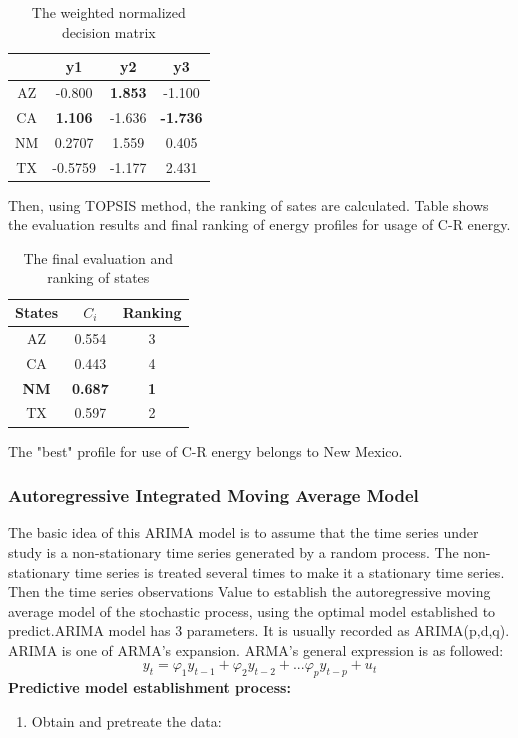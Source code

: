 \documentclass{mcmthesis}
\begin{document}
\begin{enumerate}
      \begin{table}
      \centering
      \begin{tabular}{cccc}
      \hline
      {}&{y1}&{y2}&{y3}\\
      \hline
      {AZ}&-0.800&\textbf{1.853}&-1.100\\
      \hline
      {CA}&\textbf{1.106}&-1.636&\textbf{-1.736}\\
      \hline
      {NM}&0.2707&1.559&0.405\\
      \hline
      {TX}&-0.5759&-1.177&2.431\\
      \hline
      \end{tabular}
      \caption{The weighted normalized decision matrix}
      \end{table}

      Then, using TOPSIS method, the ranking of sates are calculated. Table shows the evaluation results and final ranking of energy profiles for usage of C-R energy.

      \begin{table}
      \begin{tabular}{ccc}
      \hline
      {States}&{$C_i$}&{Ranking}\\
      \hline
      {AZ}&0.554&3\\
      \hline
      {CA}&0.443&4\\
      \hline
      \textbf{NM}&\textbf{0.687}&\textbf{1}\\
      \hline
      {TX}&0.597&2\\
      \hline

      \end{tabular}
      \caption{The final evaluation and ranking of states}
      \end{table}

      The "best" profile for use of C-R energy  belongs to New Mexico.



        \subsubsection{Autoregressive Integrated Moving Average Model}
        The basic idea of this ARIMA model is to assume that the time series under study is a non-stationary time series generated by a random process. The non-stationary time series is treated several times to make it a stationary time series. Then the time series observations Value to establish the autoregressive moving average model of the stochastic process, using the optimal model established to predict.ARIMA model has 3 parameters. It is usually recorded as ARIMA(p,d,q). ARIMA is one of ARMA's expansion.
        ARMA's general expression is as followed:
        $$y_{t}=\varphi_{1}y_{t-1}+\varphi_{2}y_{t-2}+...\varphi_{p}y_{t-p}+u_{t}$$
        \textbf{Predictive model establishment process:}
        \begin{enumerate}
          \item Obtain and pretreate the data:


\end{enumerate}
\end{enumerate}
\end{document}
